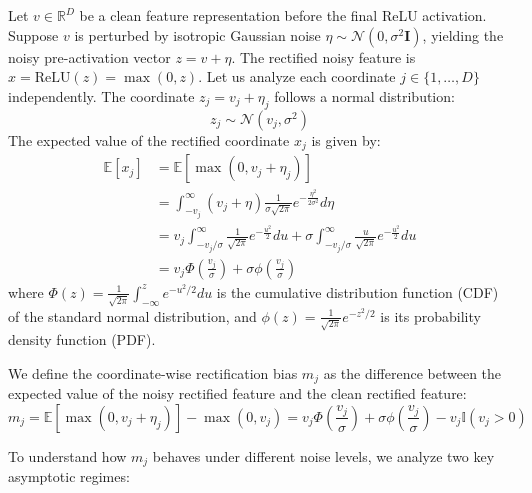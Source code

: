 \documentclass{article}
\theoremstyle{plain}
\theoremstyle{definition}
\theoremstyle{remark}
\begin{document}
Let $v \in \mathbb{R}^D$ be a clean feature representation before the final ReLU activation. Suppose $v$ is perturbed by isotropic Gaussian noise $\eta \sim \mathcal{N}(0, \sigma^2 \mathbf{I})$, yielding the noisy pre-activation vector $z = v + \eta$.
The rectified noisy feature is $x = \text{ReLU}(z) = \max(0, z)$.
Let us analyze each coordinate $j \in \{1, \dots, D\}$ independently. The coordinate $z_j = v_j + \eta_j$ follows a normal distribution:
\begin{equation}
    z_j \sim \mathcal{N}(v_j, \sigma^2)
\end{equation}
The expected value of the rectified coordinate $x_j$ is given by:
\begin{align}
    \mathbb{E}[x_j] &= \mathbb{E}[\max(0, v_j + \eta_j)] \nonumber \\
    &= \int_{-v_j}^{\infty} (v_j + \eta) \frac{1}{\sigma \sqrt{2\pi}} e^{-\frac{\eta^2}{2\sigma^2}} d\eta \nonumber \\
    &= v_j \int_{-v_j/\sigma}^{\infty} \frac{1}{\sqrt{2\pi}} e^{-\frac{u^2}{2}} du + \sigma \int_{-v_j/\sigma}^{\infty} \frac{u}{\sqrt{2\pi}} e^{-\frac{u^2}{2}} du \nonumber \\
    &= v_j \Phi\left(\frac{v_j}{\sigma}\right) + \sigma \phi\left(\frac{v_j}{\sigma}\right)
\end{align}
where $\Phi(z) = \frac{1}{\sqrt{2\pi}} \int_{-\infty}^z e^{-u^2/2} du$ is the cumulative distribution function (CDF) of the standard normal distribution, and $\phi(z) = \frac{1}{\sqrt{2\pi}} e^{-z^2/2}$ is its probability density function (PDF).

We define the coordinate-wise rectification bias $m_j$ as the difference between the expected value of the noisy rectified feature and the clean rectified feature:
\begin{equation}
    m_j = \mathbb{E}[\max(0, v_j + \eta_j)] - \max(0, v_j) = v_j \Phi\left(\frac{v_j}{\sigma}\right) + \sigma \phi\left(\frac{v_j}{\sigma}\right) - v_j \mathbb{I}(v_j > 0)
\end{equation}

To understand how $m_j$ behaves under different noise levels, we analyze two key asymptotic regimes:
\end{document}
